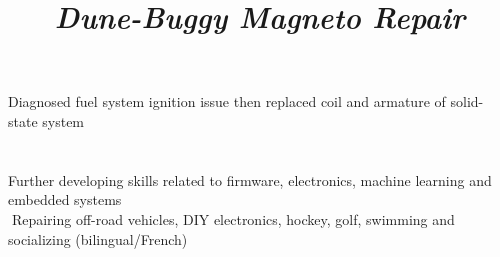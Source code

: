 \documentclass[mm]{res}
\begin{document}
\begin{resume}

\title{\textsl{Dune-Buggy Magneto Repair}}
\begin{position}
\tb Diagnosed fuel system ignition issue then replaced coil and armature of solid-state system
\end{position}

%



\toprule

\section{\headinginterests}
\tb Further developing skills related to firmware, electronics, machine learning and embedded systems\\
􏰚\tb Repairing off-road vehicles, DIY electronics, hockey, golf, swimming and socializing (bilingual/French)

\end{resume}
\end{document}
